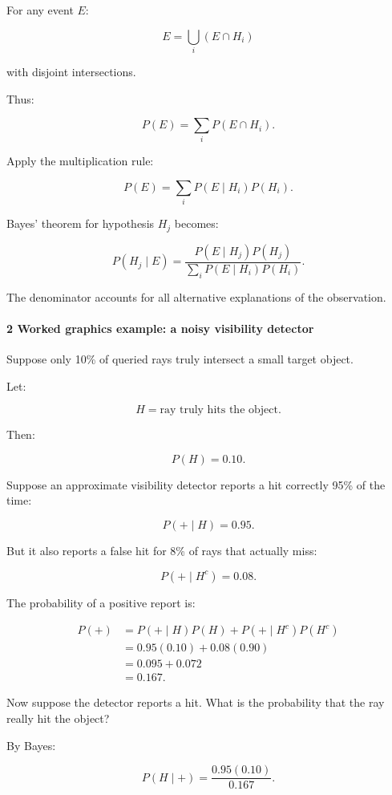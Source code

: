 For any event \(E\):

\[
 E=\bigcup_i(E\cap H_i)
\]

with disjoint intersections.

Thus:

\[
 P(E)=\sum_iP(E\cap H_i).
\]

Apply the multiplication rule:

\[
 \boxed{ P(E)=\sum_iP(E\mid H_i)P(H_i) }.
\]

Bayes' theorem for hypothesis \(H_j\) becomes:

\[
 \boxed{ P(H_j\mid E) = \frac{ P(E\mid H_j)P(H_j) }{ \sum_iP(E\mid H_i)P(H_i) } }.
\]

The denominator accounts for all alternative explanations of the observation.

\paragraph{2 Worked graphics example: a noisy visibility detector}\label{worked-graphics-example-a-noisy-visibility-detector}

Suppose only 10\% of queried rays truly intersect a small target object.

Let:

\[
 H=\text{ray truly hits the object}.
\]

Then:

\[
 P(H)=0.10.
\]

Suppose an approximate visibility detector reports a hit correctly 95\% of the time:

\[
 P(+\mid H)=0.95.
\]

But it also reports a false hit for 8\% of rays that actually miss:

\[
 P(+\mid H^c)=0.08.
\]

The probability of a positive report is:

\[
 \begin{aligned} P(+) &=P(+\mid H)P(H) +P(+\mid H^c)P(H^c)\\ &=0.95(0.10)+0.08(0.90)\\ &=0.095+0.072\\ &=\boxed{0.167}. \end{aligned}
\]

Now suppose the detector reports a hit. What is the probability that the ray really hit the object?

By Bayes:

\[
 P(H\mid+) = \frac{0.95(0.10)}{0.167}.
\]

